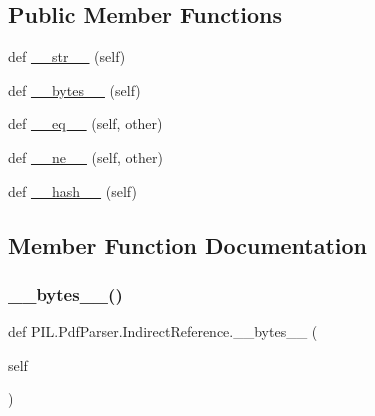 \subsection*{Public Member Functions}
\begin{DoxyCompactItemize}
\item 
def \hyperlink{classPIL_1_1PdfParser_1_1IndirectReference_a38cc4820ecb5a1e77b11b7a94c44ece8}{\+\_\+\+\_\+str\+\_\+\+\_\+} (self)
\item 
def \hyperlink{classPIL_1_1PdfParser_1_1IndirectReference_a7d1dd99b87728518a3a0c268093dfc8d}{\+\_\+\+\_\+bytes\+\_\+\+\_\+} (self)
\item 
def \hyperlink{classPIL_1_1PdfParser_1_1IndirectReference_ad1cf87ccbbb5be62cba56a06bceeab9c}{\+\_\+\+\_\+eq\+\_\+\+\_\+} (self, other)
\item 
def \hyperlink{classPIL_1_1PdfParser_1_1IndirectReference_a7086066a1536df849049b13d0dbdea8a}{\+\_\+\+\_\+ne\+\_\+\+\_\+} (self, other)
\item 
def \hyperlink{classPIL_1_1PdfParser_1_1IndirectReference_addf40b32ba9529d8240f14ab1fb99e71}{\+\_\+\+\_\+hash\+\_\+\+\_\+} (self)
\end{DoxyCompactItemize}


\subsection{Member Function Documentation}
\mbox{\label{classPIL_1_1PdfParser_1_1IndirectReference_a7d1dd99b87728518a3a0c268093dfc8d}} 
\subsubsection{\texorpdfstring{\+\_\+\+\_\+bytes\+\_\+\+\_\+()}{\_\_bytes\_\_()}}
{\footnotesize\ttfamily def P\+I\+L.\+Pdf\+Parser.\+Indirect\+Reference.\+\_\+\+\_\+bytes\+\_\+\+\_\+ (\begin{DoxyParamCaption}\item[{}]{self }\end{DoxyParamCaption})}

\mbox{\label{classPIL_1_1PdfParser_1_1IndirectReference_ad1cf87ccbbb5be62cba56a06bceeab9c}} 
